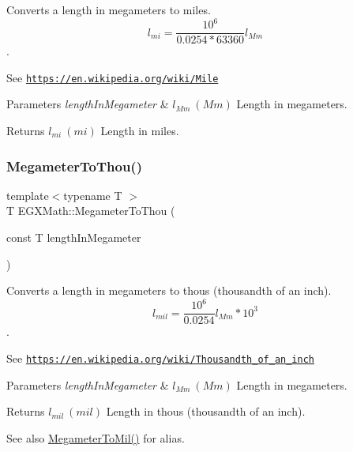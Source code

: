 Converts a length in megameters to miles. \[ l_{mi}=\frac{10^{6}}{0.0254 * 63360} l_{Mm} \]. 

See \href{https://en.wikipedia.org/wiki/Mile}{\tt https\+://en.\+wikipedia.\+org/wiki/\+Mile} 
\begin{DoxyParams}{Parameters}
{\em length\+In\+Megameter} & $ l_{Mm}\ (Mm)$ Length in megameters. \\
\hline
\end{DoxyParams}
\begin{DoxyReturn}{Returns}
$ l_{mi}\ (mi)$ Length in miles. 
\end{DoxyReturn}
\mbox{\label{group___e_g_x_math-_conversions-_length_conversions-_s_i-_megameter-_imperial_gae791a30b052a322fff88090e90fe32b5}} 
\subsubsection{\texorpdfstring{Megameter\+To\+Thou()}{MegameterToThou()}}
{\footnotesize\ttfamily template$<$typename T $>$ \\
T E\+G\+X\+Math\+::\+Megameter\+To\+Thou (\begin{DoxyParamCaption}\item[{const T}]{length\+In\+Megameter }\end{DoxyParamCaption})}



Converts a length in megameters to thous (thousandth of an inch). \[ l_{mil}= \frac{10^{6}}{0.0254} l_{Mm} * 10^{3} \]. 

See \href{https://en.wikipedia.org/wiki/Thousandth_of_an_inch}{\tt https\+://en.\+wikipedia.\+org/wiki/\+Thousandth\+\_\+of\+\_\+an\+\_\+inch} 
\begin{DoxyParams}{Parameters}
{\em length\+In\+Megameter} & $ l_{Mm}\ (Mm)$ Length in megameters. \\
\hline
\end{DoxyParams}
\begin{DoxyReturn}{Returns}
$ l_{mil}\ (mil)$ Length in thous (thousandth of an inch). 
\end{DoxyReturn}
\begin{DoxySeeAlso}{See also}
\mbox{\hyperlink{group___e_g_x_math-_conversions-_length_conversions-_s_i-_megameter-_imperial_ga9494edd6659b7f69549d4fe96b9e2f98}{Megameter\+To\+Mil()}} for alias. 
\end{DoxySeeAlso}
\mbox{\label{group___e_g_x_math-_conversions-_length_conversions-_s_i-_megameter-_imperial_gae8b77cb5d4f8cf566968e18dde870c74}} 
